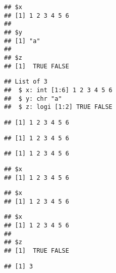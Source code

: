 \documentclass[paper=a4,headsepline,BCOR=12mm,twoside,open=right,%
titlepage,headings=small,fontsize=10pt,index=totoc,bibliography=totoc,%
captions=tableheading,captions=nooneline]{scrbook}\usepackage{knitr}
\begin{document}
\begin{knitrout}\footnotesize
{}\color{fgcolor}\begin{kframe}
\begin{alltt}
 \hlkwb{<-} \hlstd{(} \hlstd{=} \hlopt{:}\hlstd{,}  \hlstd{=} \hlstd{,}  \hlstd{=} \hlstd{(}\hlstd{,} \hlstd{))}
\end{alltt}
\begin{verbatim}
## $x
## [1] 1 2 3 4 5 6
## 
## $y
## [1] "a"
## 
## $z
## [1]  TRUE FALSE
\end{verbatim}
\begin{alltt}
\end{alltt}
\begin{verbatim}
## List of 3
##  $ x: int [1:6] 1 2 3 4 5 6
##  $ y: chr "a"
##  $ z: logi [1:2] TRUE FALSE
\end{verbatim}
\begin{alltt}
\hlopt{$}
\end{alltt}
\begin{verbatim}
## [1] 1 2 3 4 5 6
\end{verbatim}
\begin{alltt}
\hlstd{a.list[[}\hlstd{]]}
\end{alltt}
\begin{verbatim}
## [1] 1 2 3 4 5 6
\end{verbatim}
\begin{alltt}
\hlstd{a.list[[}\hlstd{]]}
\end{alltt}
\begin{verbatim}
## [1] 1 2 3 4 5 6
\end{verbatim}
\begin{alltt}
\hlstd{a.list[}\hlstd{]}
\end{alltt}
\begin{verbatim}
## $x
## [1] 1 2 3 4 5 6
\end{verbatim}
\begin{alltt}
\hlstd{a.list[}\hlstd{]}
\end{alltt}
\begin{verbatim}
## $x
## [1] 1 2 3 4 5 6
\end{verbatim}
\begin{alltt}
\hlstd{a.list[}\hlstd{(}\hlstd{,}\hlstd{)]}
\end{alltt}
\begin{verbatim}
## $x
## [1] 1 2 3 4 5 6
## 
## $z
## [1]  TRUE FALSE
\end{verbatim}
\begin{alltt}
\hlstd{(a.list[[}\hlstd{(}\hlstd{,}\hlstd{)]])}
\end{alltt}
\begin{verbatim}
## [1] 3
\end{verbatim}
\end{kframe}
\end{knitrout}
\end{document}
